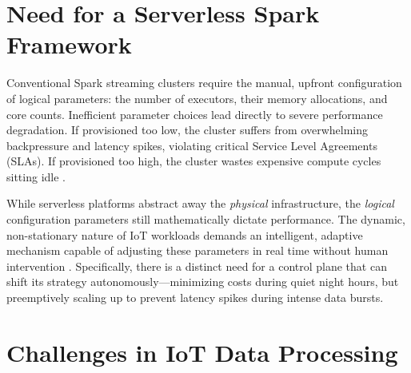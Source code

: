 \section{Need for a Serverless Spark Framework}

Conventional Spark streaming clusters require the manual, upfront configuration of 
logical parameters: the number of executors, their memory allocations, and core counts. 
Inefficient parameter choices lead directly to severe performance degradation. If provisioned 
too low, the cluster suffers from overwhelming backpressure and latency spikes, violating 
critical Service Level Agreements (SLAs). If provisioned too high, the cluster wastes expensive 
compute cycles sitting idle \cite{eismann2021serverless}. 

While serverless platforms abstract away the \textit{physical} infrastructure, the 
\textit{logical} configuration parameters still mathematically dictate performance. 
The dynamic, non-stationary nature of IoT workloads demands an intelligent, adaptive mechanism 
capable of adjusting these parameters in real time without human intervention 
\cite{shahrad2020serverless}. Specifically, there is a distinct need for a control plane 
that can shift its strategy autonomously---minimizing costs during quiet night hours, 
but preemptively scaling up to prevent latency spikes during intense data bursts.

\section{Challenges in IoT Data Processing}

